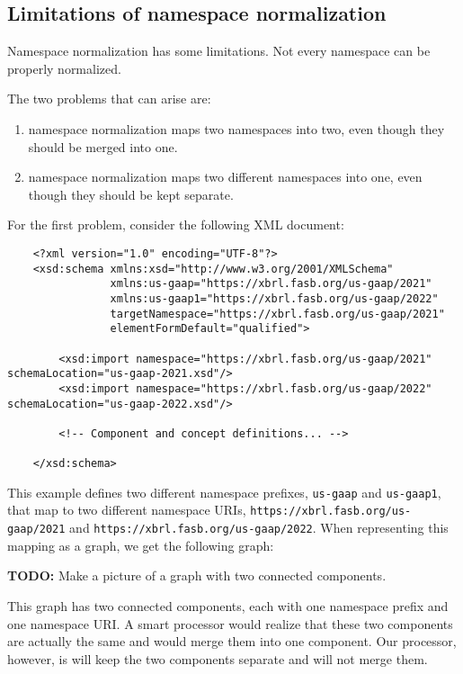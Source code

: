 \subsection{Limitations of namespace normalization}

Namespace normalization has some limitations. Not every namespace can be properly normalized. 

The two problems that can arise are:

\begin{enumerate}
    \item namespace normalization maps two namespaces into two, even though they should be merged into one.
    \item namespace normalization maps two different namespaces into one, even though they should be kept separate.
\end{enumerate}

For the first problem, consider the following XML document:

\begin{lstlisting}
    <?xml version="1.0" encoding="UTF-8"?>
    <xsd:schema xmlns:xsd="http://www.w3.org/2001/XMLSchema"
                xmlns:us-gaap="https://xbrl.fasb.org/us-gaap/2021"
                xmlns:us-gaap1="https://xbrl.fasb.org/us-gaap/2022"
                targetNamespace="https://xbrl.fasb.org/us-gaap/2021"
                elementFormDefault="qualified">

        <xsd:import namespace="https://xbrl.fasb.org/us-gaap/2021" schemaLocation="us-gaap-2021.xsd"/>
        <xsd:import namespace="https://xbrl.fasb.org/us-gaap/2022" schemaLocation="us-gaap-2022.xsd"/>

        <!-- Component and concept definitions... -->

    </xsd:schema>

\end{lstlisting}

This example defines two different namespace prefixes, \texttt{us-gaap} and \texttt{us-gaap1}, that map to two different namespace URIs, \texttt{https://xbrl.fasb.org/us-gaap/2021} and \texttt{https://xbrl.fasb.org/us-gaap/2022}.
When representing this mapping as a graph, we get the following graph:

\textbf{TODO:} Make a picture of a graph with two connected components.

This graph has two connected components, each with one namespace prefix and one namespace URI.
A smart processor would realize that these two components are actually the same and would merge them into one component.
Our processor, however, is will keep the two components separate and will not merge them.

